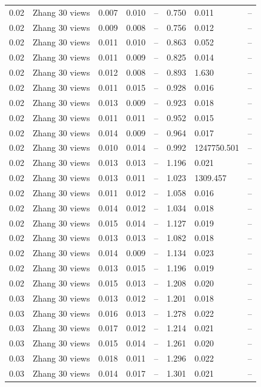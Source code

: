 \begin{table}[H]
\begin{tabular}{l c l l l}
0.02 & Zhang 30 views & 0.007 & 0.010 & -- & 0.750 & 0.011 & -- \\
0.02 & Zhang 30 views & 0.009 & 0.008 & -- & 0.756 & 0.012 & -- \\
0.02 & Zhang 30 views & 0.011 & 0.010 & -- & 0.863 & 0.052 & -- \\
0.02 & Zhang 30 views & 0.011 & 0.009 & -- & 0.825 & 0.014 & -- \\
0.02 & Zhang 30 views & 0.012 & 0.008 & -- & 0.893 & 1.630 & -- \\
0.02 & Zhang 30 views & 0.011 & 0.015 & -- & 0.928 & 0.016 & -- \\
0.02 & Zhang 30 views & 0.013 & 0.009 & -- & 0.923 & 0.018 & -- \\
0.02 & Zhang 30 views & 0.011 & 0.011 & -- & 0.952 & 0.015 & -- \\
0.02 & Zhang 30 views & 0.014 & 0.009 & -- & 0.964 & 0.017 & -- \\
0.02 & Zhang 30 views & 0.010 & 0.014 & -- & 0.992 & 1247750.501 & -- \\
0.02 & Zhang 30 views & 0.013 & 0.013 & -- & 1.196 & 0.021 & -- \\
0.02 & Zhang 30 views & 0.013 & 0.011 & -- & 1.023 & 1309.457 & -- \\
0.02 & Zhang 30 views & 0.011 & 0.012 & -- & 1.058 & 0.016 & -- \\
0.02 & Zhang 30 views & 0.014 & 0.012 & -- & 1.034 & 0.018 & -- \\
0.02 & Zhang 30 views & 0.015 & 0.014 & -- & 1.127 & 0.019 & -- \\
0.02 & Zhang 30 views & 0.013 & 0.013 & -- & 1.082 & 0.018 & -- \\
0.02 & Zhang 30 views & 0.014 & 0.009 & -- & 1.134 & 0.023 & -- \\
0.02 & Zhang 30 views & 0.013 & 0.015 & -- & 1.196 & 0.019 & -- \\
0.02 & Zhang 30 views & 0.015 & 0.013 & -- & 1.208 & 0.020 & -- \\
0.03 & Zhang 30 views & 0.013 & 0.012 & -- & 1.201 & 0.018 & -- \\
0.03 & Zhang 30 views & 0.016 & 0.013 & -- & 1.278 & 0.022 & -- \\
0.03 & Zhang 30 views & 0.017 & 0.012 & -- & 1.214 & 0.021 & -- \\
0.03 & Zhang 30 views & 0.015 & 0.014 & -- & 1.261 & 0.020 & -- \\
0.03 & Zhang 30 views & 0.018 & 0.011 & -- & 1.296 & 0.022 & -- \\
0.03 & Zhang 30 views & 0.014 & 0.017 & -- & 1.301 & 0.021 & -- \\

\end{tabular}
\end{table}
